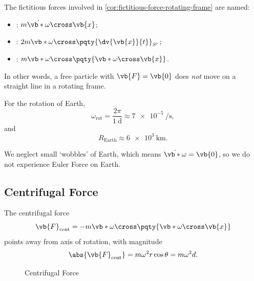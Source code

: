 \begin{definition}
    The fictitious forces involved in \autoref{cor:fictitious-force-rotating-frame} are named:
    \begin{itemize}
        \item {}: \(m \dot{\vb*{\omega}} \cross \vb{x}\);
        \item {}: \(2 m \vb*{\omega} \cross \pqty{\dv{\vb{x}}{t}}_{S'}\);
        \item {}: \(m \vb*{\omega} \cross \pqty{\vb*{\omega} \cross \vb{x}}\).
    \end{itemize}
\end{definition}

In other words, a free particle with \(\vb{F} = \vb{0}\) does \emph{not} move on a straight line in a rotating frame.

\begin{example}
    \label{ex:rotation-of-earth}%
    For the rotation of Earth,
    \begin{equation}
        \omega_{\text{rot}} = \frac{2 \pi}{\SI{1}{\day}} \approx \SI{7e-5}{\per\second},
    \end{equation}
    and
    \begin{equation}
        R_{\text{Earth}} \approx \SI{6e3}{\kilo\metre}.
    \end{equation}

    We neglect small `wobbles' of Earth, which means \(\dot{\vb*{\omega}} = \vb{0}\), so we do not experience Euler Force on Earth.
\end{example}

\subsection{Centrifugal Force}

The centrifugal force
\begin{equation}
    \vb{F}_{\text{cent}} = - m \vb*{\omega} \cross \pqty{\vb*{\omega} \cross \vb{x}}
\end{equation}
points away from axis of rotation, with magnitude
\begin{equation}
    \abs{\vb{F}_{\text{cent}}} = m \omega^2 r \cos \theta = m \omega^2 d.
\end{equation}

\begin{figure}[ht!]
    \centering

    \caption{Centrifugal Force}
    \label{fig:centrifugal-force}%
\end{figure}

